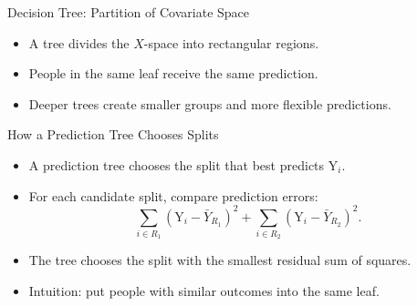 \documentclass[hyperref={pdfpagelabels=false}]{beamer}
\begin{document}
\begin{frame}{Decision Tree: Partition of Covariate Space}
\begin{center}
\end{center}

\vspace{0.2cm}
\begin{itemize}
  \item A tree divides the $X$-space into rectangular regions.
  \item People in the same leaf receive the same prediction.
  \item Deeper trees create smaller groups and more flexible predictions.
\end{itemize}
\end{frame}

\begin{frame}{How a Prediction Tree Chooses Splits}
\begin{itemize}
  \item A prediction tree chooses the split that best predicts $\mathrm{Y}_i$.
  \vspace{0.2cm}
  \item For each candidate split, compare prediction errors:
  \[
    \sum_{i\in R_1}\left(\mathrm{Y}_i-\bar{Y}_{R_1}\right)^2
    +
    \sum_{i\in R_2}\left(\mathrm{Y}_i-\bar{Y}_{R_2}\right)^2.
  \]
  \vspace{0.2cm}
  \item The tree chooses the split with the smallest residual sum of squares.
  \vspace{0.2cm}
  \item Intuition: put people with similar outcomes into the same leaf.
\end{itemize}
\end{frame}
\end{document}
